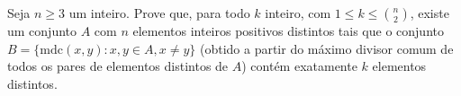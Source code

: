 Seja $n \geq 3$ um inteiro. Prove que, para todo $k$ inteiro, com $1 \leq k \leq \binom{n}{2}$, existe um conjunto $A$ com $n$ elementos inteiros positivos distintos tais que o conjunto $B = \{\mathrm{mdc}(x, y): x, y \in A, x \neq y \}$ (obtido a partir do máximo divisor comum de todos os pares de elementos distintos de $A$) contém exatamente $k$ elementos distintos.